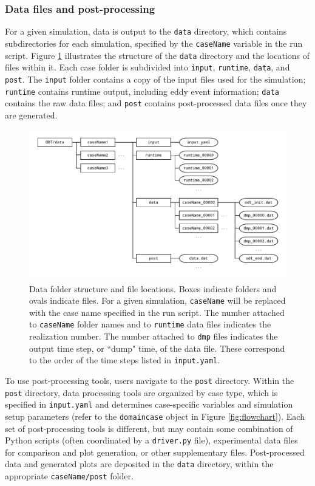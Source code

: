 \documentclass[preprint,12pt, a4paper]{elsarticle}
\begin{document}
\subsubsection{Data files and post-processing}

For a given simulation, data is output to the \texttt{data} directory, which contains subdirectories for each simulation, specified by the \texttt{caseName} variable in the run script. Figure \ref{fig:data_folder_structure} illustrates the structure of the \texttt{data} directory and the locations of files within it. Each case folder is subdivided into \texttt{input}, \texttt{runtime}, \texttt{data}, and \texttt{post}. The \texttt{input} folder contains a copy of the input files used for the simulation; \texttt{runtime} contains runtime output, including eddy event information; \texttt{data} contains the raw data files; and \texttt{post} contains post-processed data files once they are generated. 

\begin{figure}
	\centering
    \includegraphics[width=\textwidth]{fig_data_folder_structure.pdf} 
	\caption{Data folder structure and file locations. Boxes indicate folders and ovals indicate files. For a given simulation, \texttt{caseName} will be replaced with the case name specified in the run script. The number attached to \texttt{caseName} folder names and to \texttt{runtime} data files indicates the realization number. The number attached to \texttt{dmp} files indicates the output time step, or ``dump" time, of the data file. These correspond to the order of the time steps listed in \texttt{input.yaml}.}
\label{fig:data_folder_structure}
\end{figure}

To use post-processing tools, users navigate to the \texttt{post} directory. Within the \texttt{post} directory, data processing tools are organized by case type, which is specified in \texttt{input.yaml} and determines case-specific variables and simulation setup parameters (refer to the \texttt{domaincase} object in Figure \ref{fig:flowchart}). Each set of post-processing tools is different, but may contain some combination of Python scripts (often coordinated by a \texttt{driver.py} file), experimental data files for comparison and plot generation, or other supplementary files. Post-processed data and generated plots are deposited in the \texttt{data} directory, within the appropriate \texttt{caseName/post} folder.  
\end{document}
